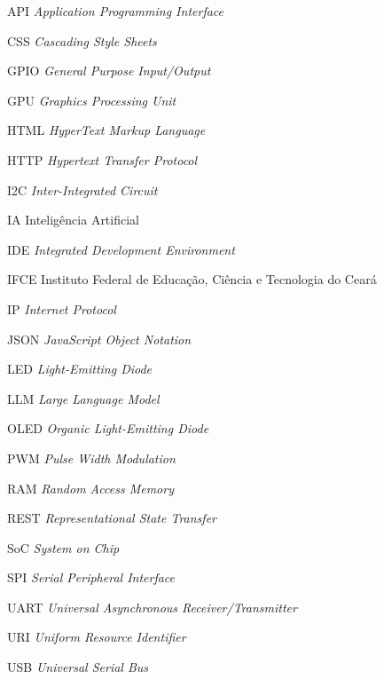 
\listoffigures*
\cleardoublepage

\listofquadros*
\cleardoublepage

\listoftables*
\cleardoublepage

\begin{siglas}
  \item[API] \textit{Application Programming Interface}
  \item[CSS] \textit{Cascading Style Sheets}
  \item[GPIO] \textit{General Purpose Input/Output}
  \item[GPU] \textit{Graphics Processing Unit}
  \item[HTML] \textit{HyperText Markup Language}
  \item[HTTP] \textit{Hypertext Transfer Protocol}
  \item[I2C] \textit{Inter-Integrated Circuit}
  \item[IA] Inteligência Artificial
  \item[IDE] \textit{Integrated Development Environment}
  \item[IFCE] Instituto Federal de Educação, Ciência e Tecnologia do Ceará
  \item[IP] \textit{Internet Protocol}
  \item[JSON] \textit{JavaScript Object Notation}
  \item[LED] \textit{Light-Emitting Diode}
  \item[LLM] \textit{Large Language Model}
  \item[OLED] \textit{Organic Light-Emitting Diode}
  \item[PWM] \textit{Pulse Width Modulation}
  \item[RAM] \textit{Random Access Memory}
  \item[REST] \textit{Representational State Transfer}
  \item[SoC] \textit{System on Chip}
  \item[SPI] \textit{Serial Peripheral Interface}
  \item[UART] \textit{Universal Asynchronous Receiver/Transmitter}
  \item[URI] \textit{Uniform Resource Identifier}
  \item[USB] \textit{Universal Serial Bus}
\end{siglas}

\tableofcontents*
\cleardoublepage
